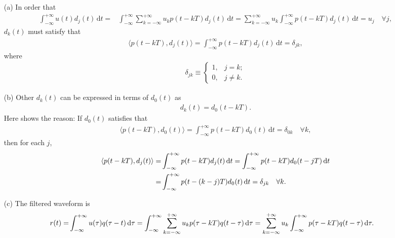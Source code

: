 \documentclass{assignment}
\begin{document}
\begin{sol}
    \begin{itemize}
        \item[(a)] In order that
        \begin{align}
            \int_{-\infty}^{+\infty}u(t)d_j(t)\,\mathrm{d}t=&\int_{-\infty}^{+\infty}\sum_{k=-\infty}^{+\infty}u_kp(t-kT)d_j(t)\,\mathrm{d}t=\sum_{k=-\infty}^{+\infty}u_k\int_{-\infty}^{+\infty}p(t-kT)d_j(t)\,\mathrm{d}t=u_j\quad\forall j,
        \end{align}
        $d_k(t)$ must satisfy that
        \begin{align}
            \label{P-4-dk(t)-constrain}
            \langle p(t-kT),d_j(t)\rangle=\int_{-\infty}^{+\infty}p(t-kT)d_j(t)\,\mathrm{d}t=\delta_{jk},
        \end{align}
        where
        \begin{align}
            \delta_{jk}\equiv\left\{\begin{array}{ll}
                1,&j=k;\\
                0,&j\neq k.
            \end{array}\right.
        \end{align}
        \item[(b)] Other $d_k(t)$ can be expressed in terms of $d_0(t)$ as
        \begin{align}
            d_k(t)=d_0(t-kT).
        \end{align}
        Here shows the reason: If $d_0(t)$ satisfies that
        \begin{align}
            \langle p(t-kT),d_0(t)\rangle=\int_{-\infty}^{+\infty}p(t-kT)d_0(t)\,\mathrm{d}t=\delta_{0k}\quad\forall k,
        \end{align}
        then for each $j$,
        \begin{align}
            \notag\langle p(t-kT),d_j(t)\rangle=&\int_{-\infty}^{+\infty}p(t-kT)d_j(t)\,\mathrm{d}t=\int_{-\infty}^{+\infty}p(t-kT)d_0(t-jT)\,\mathrm{d}t\\
            =&\int_{-\infty}^{+\infty}p(t-(k-j)T)d_0(t)\,\mathrm{d}t=\delta_{jk}\quad\forall k.
        \end{align}
        \item[(c)] The filtered waveform is
        \begin{align}
            \notag r(t)=&\int_{-\infty}^{+\infty}u(\tau)q(\tau-t)\,\mathrm{d}\tau=\int_{-\infty}^{+\infty}\sum_{k=-\infty}^{+\infty}u_kp(\tau-kT)q(t-\tau)\,\mathrm{d}\tau=\sum_{k=-\infty}^{+\infty}u_k\int_{-\infty}^{+\infty}p(\tau-kT)q(t-\tau)\,\mathrm{d}\tau.

\end{align}
\end{itemize}
\end{sol}
\end{document}
